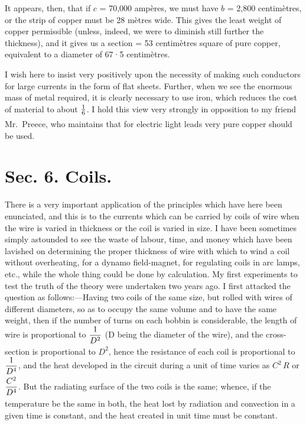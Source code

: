 \documentclass[12pt,oneside]{book}[2021/10/04]
\newcommand{\xp}{\rule[-2.2ex]{0pt}{3.4ex}}
\newcommand{\xpa}{\rule[-1.6ex]{0pt}{3.4ex}}
\begin{document}
It appears, then, that if \(c\) = 70,000 ampères, we must have
\(b\) = 2,800 centimètres, or the strip of copper must be 28 mètres
wide. This gives the least weight of copper permissible (unless,
indeed, we were to diminish still further the thickness), and it
gives us a section = 53 centimètres square of pure copper,
equivalent to a diameter of 67·5 centimètres.

I wish here to insist very positively upon the necessity of
making such conductors for large currents in the form of flat
sheets. Further, when we see the enormous mass of metal
required, it is clearly necessary to use iron, which reduces the
cost of material to about \(\xpa\frac{1}{6}\). I hold this view very strongly in
opposition to my friend Mr.\ Preece, who maintains that for
electric light leads very pure copper should be used.

\section*{Sec. 6. Coils.}

There is a very important application of the principles which
have here been enunciated, and this is to the currents which can
be carried by coils of wire when the wire is varied in thickness
or the coil is varied in size. I have been sometimes simply
astounded to see the waste of labour, time, and money which have
been lavished on determining the proper thickness of wire with
which to wind a coil without overheating, for a dynamo field-magnet,
for regulating coils in arc lamps, etc., while the whole
thing could be done by calculation. My first experiments to test
the truth of the theory were undertaken two years ago. I first
attacked the question as follows:—Having two coils of the same
size, but rolled with wires of different diameters, so as to occupy
the same volume and to have the same weight, then if the
number of turns on each bobbin is considerable, the length of
wire is proportional to \(\xp\dfrac{1}{D^2}\) (D being the diameter of the wire),
and the cross-section is proportional to \(D^2\), hence the resistance
of each coil is proportional to \(\xp\dfrac{1}{D^4}\), and the heat developed in the
circuit during a unit of time varies as \(C^2\, R\) or \(\xp\dfrac{C^2}{D^4}\). But the
radiating surface of the two coils is the same; whence, if the
temperature be the same in both, the heat lost by radiation and
convection in a given time is constant, and the heat created in
unit time must be constant.
\end{document}
